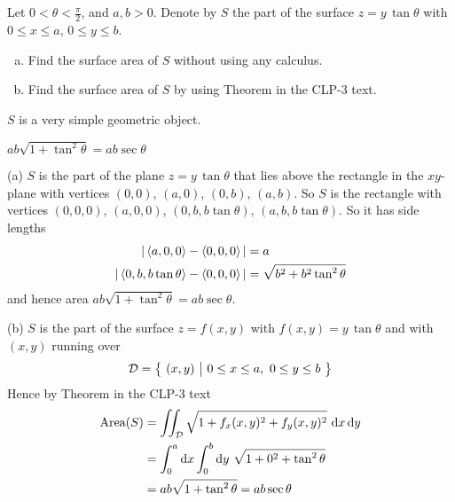 


\subsection*{\Conceptual}


\begin{question}
Let $0<\theta<\frac{\pi}{2}$, and $a,b>0$. Denote by $S$ the part of 
the surface $z=y\,\tan\theta$ with $0\le x\le a$, $0\le y\le b$.
\begin{enumerate}[(a)]
\item 
Find the surface area of $S$ without using any calculus.
\item
Find the surface area of $S$ by using Theorem 
in the CLP-3 text.
\end{enumerate}

\end{question}

\begin{hint} 
$S$ is a very simple geometric object.
\end{hint}

\begin{answer} 
$ab\sqrt{1+\tan^2\theta}=ab\sec\theta$
\end{answer}

\begin{solution}
(a) $S$ is the part of the plane $z=y\,\tan\theta$ that lies above the 
rectangle in the $xy$-plane with vertices $(0,0)$, $(a,0)$, $(0,b)$, $(a,b)$. 
So $S$ is the rectangle with vertices $(0,0,0)$, 
$(a,0,0)$, $(0,b,b\tan\theta)$, $(a,b,b\tan\theta)$. So it has side lengths
\begin{align*}
|\left< a,0,0\right> -\left< 0,0,0\right>| &=a \\
|\left< 0,b,b\tan\theta\right> -\left< 0,0,0\right>| &=  \sqrt{b^2+b^2\tan^2\theta}
\end{align*}
and hence area $ab\sqrt{1+\tan^2\theta}=ab\sec\theta$.

(b) $S$ is the part of the surface $z=f(x,y)$ with $f(x,y) = y\,\tan\theta$
and with $(x,y)$ running over
\begin{equation*}
\cD =\Set{(x,y)}{0\le x\le a,\ 0\le y\le b}
\end{equation*}
Hence by Theorem  in the CLP-3 text
\begin{align*}
\text{Area}(S)&=\dblInt_\cD \sqrt{1+f_x(x,y)^2+f_y(x,y)^2}\ \dee{x}\,\dee{y} \\
&=\int_0^a\dee{x}\int_0^b\dee{y}\ \sqrt{1+0^2+\tan^2\theta} \\
&=ab\sqrt{1+\tan^2\theta}=ab\sec\theta
\end{align*}

\end{solution}



